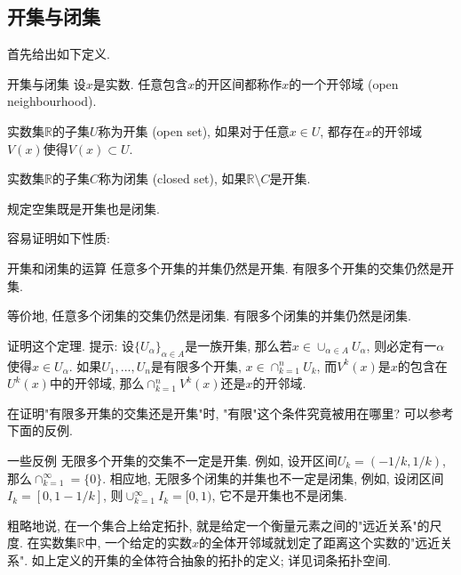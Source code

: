 

\subsection{开集与闭集}

首先给出如下定义.

\begin{definition}{开集与闭集}
设$x$是实数. 任意包含$x$的开区间都称作$x$的一个开邻域 (open neighbourhood).

实数集$\mathbb{R}$的子集$U$称为开集 (open set), 如果对于任意$x\in U$, 都存在$x$的开邻域$V(x)$使得$V(x)\subset U$. 

实数集$\mathbb{R}$的子集$C$称为闭集 (closed set), 如果$\mathbb{R}\setminus C$是开集.

规定空集既是开集也是闭集.
\end{definition}

容易证明如下性质:

\begin{theorem}{开集和闭集的运算}
任意多个开集的并集仍然是开集. 有限多个开集的交集仍然是开集.

等价地, 任意多个闭集的交集仍然是闭集. 有限多个闭集的并集仍然是闭集.
\end{theorem}

\begin{exercise}{}
证明这个定理. 提示: 设$\{U_\alpha\}_{\alpha\in A}$是一族开集, 那么若$x\in \cup_{\alpha\in A}U_\alpha$, 则必定有一$\alpha$使得$x\in U_\alpha$. 如果$U_1,...,U_n$是有限多个开集, $x\in\cap_{k=1}^nU_k$, 而$V^k(x)$是$x$的包含在$U^k(x)$中的开邻域, 那么$\cap_{k=1}^nV^k(x)$还是$x$的开邻域.
\end{exercise}

\begin{exercise}{}
在证明"有限多开集的交集还是开集"时, "有限"这个条件究竟被用在哪里? 可以参考下面的反例.
\end{exercise}

\begin{example}{一些反例}
无限多个开集的交集不一定是开集. 例如, 设开区间$U_k=(-1/k,1/k)$, 那么$\cap_{k=1}^\infty=\{0\}$. 相应地, 无限多个闭集的并集也不一定是闭集, 例如, 设闭区间$I_k=[0,1-1/k]$, 则$\cup_{k=1}^\infty I_k=[0,1)$, 它不是开集也不是闭集.
\end{example}

粗略地说, 在一个集合上给定拓扑, 就是给定一个衡量元素之间的"远近关系"的尺度. 在实数集$\mathbb{R}$中, 一个给定的实数$x$的全体开邻域就划定了距离这个实数的"远近关系". 如上定义的开集的全体符合抽象的拓扑的定义; 详见词条拓扑空间.

